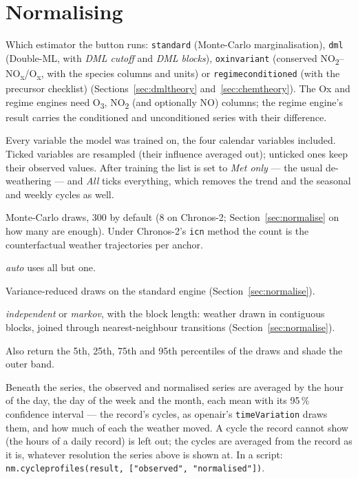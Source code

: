 \documentclass[11pt]{report}
\newcommand{\nosep}{\setlength{\itemsep}{0pt}\setlength{\parskip}{0pt}\setlength{\topsep}{2pt}}
\newcommand{\codeunderscore}{\textunderscore\allowbreak}
\newcommand{\code}[1]{\texttt{\let\_\codeunderscore #1}}
\newcommand{\NOtwo}{NO\textsubscript{2}}
\newcommand{\NOx}{NO\textsubscript{x}}
\begin{document}
\chapter{Normalising}\label{ch:normalise}

\begin{description}\nosep
  \item[Engine] Which estimator the button runs: \code{standard} (Monte-Carlo
        marginalisation), \code{dml} (Double-ML, with \emph{DML cutoff} and
        \emph{DML blocks}), \code{ox\_invariant} (conserved
        \NOtwo{}--\NOx{}/O\textsubscript{x}, with the species columns and units) or
        \code{regime\_conditioned} (with the precursor checklist)
        (Sections~\ref{sec:dmltheory} and~\ref{sec:chemtheory}). The Ox and regime
        engines need O\textsubscript{3}, \NOtwo{} (and optionally NO) columns; the
        regime engine's result carries the conditioned and unconditioned series with
        their difference.
  \item[Resample vars] Every variable the model was trained on, the four calendar
        variables included. Ticked variables are resampled (their influence averaged
        out); unticked ones keep their observed values. After training the list is set
        to \emph{Met only} --- the usual de-weathering --- and \emph{All} ticks
        everything, which removes the trend and the seasonal and weekly cycles as well.
  \item[Samples] Monte-Carlo draws, 300 by default (8 on Chronos-2;
        Section~\ref{sec:normalise} on how many are enough). Under Chronos-2's
        \code{icn} method the count is the counterfactual weather trajectories per
        anchor.
  \item[CPU cores] \emph{auto} uses all but one.
  \item[Control variates] Variance-reduced draws on the standard engine
        (Section~\ref{sec:normalise}).
  \item[Block resampling] \emph{independent} or \emph{markov}, with the block length:
        weather drawn in contiguous blocks, joined through nearest-neighbour
        transitions (Section~\ref{sec:normalise}).
  \item[5--95\,\% quantile band] Also return the 5th, 25th, 75th and 95th percentiles of
        the draws and shade the outer band.
\end{description}

Beneath the series, the observed and normalised series are averaged by the hour of the
day, the day of the week and the month, each mean with its 95\,\% confidence interval ---
the record's cycles, as openair's \code{timeVariation} draws them, and how much of each
the weather moved. A cycle the record cannot show (the hours of a daily record) is left
out; the cycles are averaged from the record as it is, whatever resolution the series
above is shown at. In a script: \code{nm.cycle\_profiles(result, ["observed",
"normalised"])}.
\end{document}
